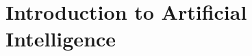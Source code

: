 \documentclass[../../book-en.tex]{subfiles}
\begin{document}
\chapter{Introduction to Artificial Intelligence}
\label{ch:1.4-intro-ai-en}














\end{document}
